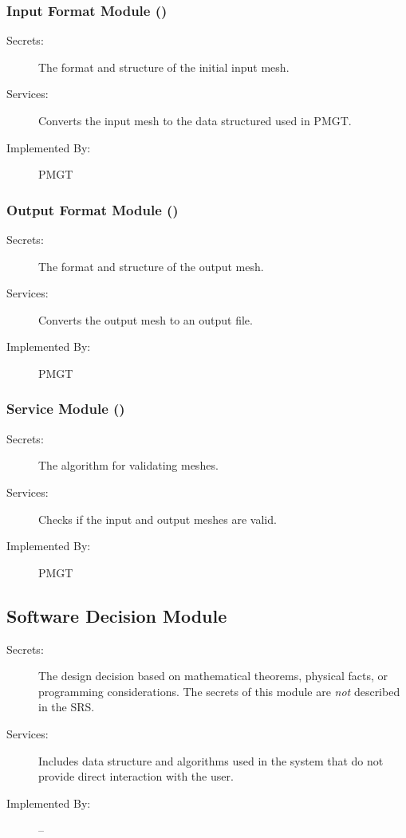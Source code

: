 \documentclass[12pt,titlepage]{article}
\begin{document}
\subsubsection{Input Format Module ()}
\begin{description}
\item[Secrets:]The format and structure of the initial input mesh.
\item[Services:]Converts the input mesh to the data structured used in PMGT.
\item[Implemented By:] PMGT
\end{description}

\subsubsection{Output Format Module ()}
\begin{description}
\item[Secrets:] The format and structure of the output mesh.
\item[Services:] Converts the output mesh to an output file.
\item[Implemented By:] PMGT
\end{description} 
 
\subsubsection{Service Module ()}
\begin{description}
\item[Secrets:] The algorithm for validating meshes.
\item[Services:] Checks if the input and output meshes are valid.
\item[Implemented By:] PMGT
\end{description}

\subsection{Software Decision Module}
\begin{description}
\item[Secrets:] The design decision based on mathematical theorems, physical facts, or programming considerations. The secrets of this module are \emph{not} described in the SRS.
\item[Services:] Includes data structure and algorithms used in the system that do not provide direct interaction with the user. %
\item[Implemented By:] --
\end{description}
\end{document}
